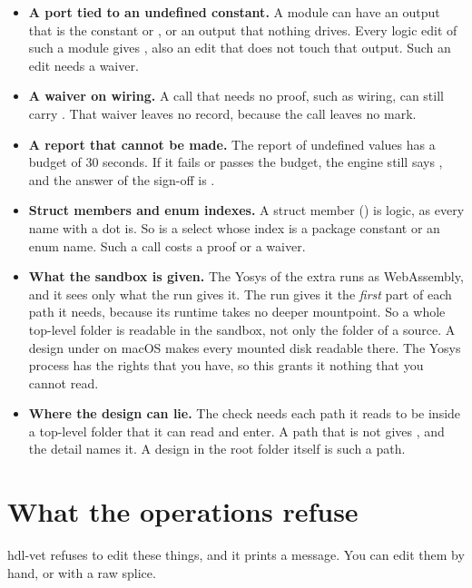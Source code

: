 \begin{itemize}
  a black box child it gives .
\item \textbf{A port tied to an undefined constant.} A module can have an output that is the
  constant  or , or an output that nothing drives. Every logic edit of such
  a module gives , also an edit that does not touch that output. Such an edit
  needs a waiver.
\item \textbf{A waiver on wiring.} A call that needs no proof, such as wiring, can still
  carry . That waiver leaves no record, because the call leaves no mark.
\item \textbf{A report that cannot be made.} The report of undefined values has a budget of
  30 seconds. If it fails or passes the budget, the engine still says , and the
  answer of the sign-off is .
\item \textbf{Struct members and enum indexes.} A struct member () is logic, as
  every name with a dot is. So is a select whose index is a package constant or an enum name.
  Such a call costs a proof or a waiver.
\item \textbf{What the sandbox is given.} The Yosys of the extra  runs as
  WebAssembly, and it sees only what the run gives it. The run gives it the \emph{first}
  part of each path it needs, because its runtime takes no deeper mountpoint. So a whole
  top-level folder is readable in the sandbox, not only the folder of a source. A design
  under  on macOS makes every mounted disk readable there. The Yosys
  process has the rights that you have, so this grants it nothing that you cannot read.
\item \textbf{Where the design can lie.} The check needs each path it reads to be inside
  a top-level folder that it can read and enter. A path that is not gives ,
  and the detail names it. A design in the root folder itself is such a path.
\end{itemize}

\section{What the operations refuse}

hdl-vet refuses to edit these things, and it prints a message. You can edit them by hand,
or with a raw splice.


